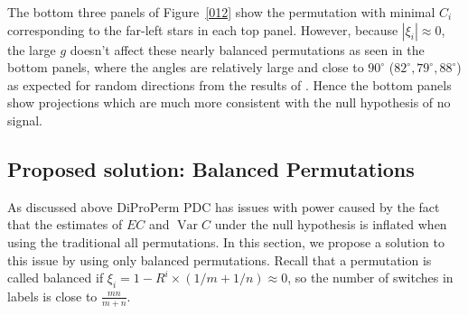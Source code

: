 \documentclass[12pt]{article}
\begin{document}
{The bottom three panels of Figure~\ref{012} show the permutation with minimal $C_i$ corresponding to the far-left stars in each top panel.  However, because $|\xi_i| \approx 0$, the large $g$ doesn't affect these nearly balanced permutations as seen in the bottom panels, where the angles are relatively large and close to $90^{\circ}$ ($82^{\circ}, 79^{\circ}, 88^{\circ}$) as expected for random directions from the results of \citet{hall2005geometric}. 
Hence the bottom panels show projections which are much more consistent with the null hypothesis of no signal. %


\subsection{Proposed solution: Balanced Permutations}
\label{c}
As discussed above DiProPerm PDC has issues with power caused by the fact that the estimates of $EC$ and $\operatorname{Var} C$ under the null hypothesis is inflated when using the traditional all permutations. In this section, we propose a solution to this issue by using only balanced permutations. Recall that a permutation is called balanced if $\xi_i=1-R^i\times(1/m+1/n) \approx 0$, so the number of switches in labels is close to $\frac{mn}{m+n}$.

}
\end{document}
